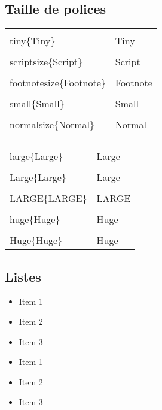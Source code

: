 \documentclass{article}
\begin{document}
\begin{multicols*}{3}
\subsection*{Taille de polices}
\begin{multicols*}{2}
  \begin{tabularx}{\columnwidth}{lX}
    \lstinline{\\tiny\{Tiny\}} & \tiny{Tiny} \\
    \lstinline{\\scriptsize\{Script\}} & \scriptsize{Script} \\
    \lstinline{\\footnotesize\{Footnote\}} & \footnotesize{Footnote} \\
    \lstinline{\\small\{Small\}} & \small{Small} \\
    \lstinline{\\normalsize\{Normal\}} & \normalsize{Normal} \\
    \end{tabularx}
  \columnbreak
  \begin{tabularx}{\columnwidth}{lX}
    \lstinline{\\large\{Large\}} & \large{Large} \\
    \lstinline{\\Large\{Large\}} & \Large{Large} \\
    \lstinline{\\LARGE\{LARGE\}} & \LARGE{LARGE} \\
    \lstinline{\\huge\{Huge\}} & \huge{Huge} \\
    \lstinline{\\Huge\{Huge\}} & \Huge{Huge} \\
  \end{tabularx}
\end{multicols*}

\subsection*{Listes}
\begin{minipage}[c]{0.3\linewidth}
\begin{itemize}
  \item Item 1
  \item Item 2
  \item Item 3
\end{itemize}
\end{minipage}
\begin{minipage}[c]{0.6\linewidth}
\begin{latexcode}
\begin{itemize}
  \item Item 1
  \item Item 2
  \item Item 3 \label{it:item3}
\end{itemize}
\end{latexcode}
\end{minipage}


\end{multicols*}
\end{document}
